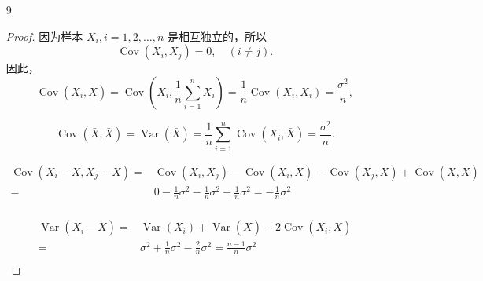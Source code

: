 \documentclass[normal,founder,mtpro2,cn]{elegantnote}
\begin{document}
\begin{enumerate}
        \item[9] 
        \begin{proof}
            因为样本 $X_{i},i=1,2,\ldots,n$ 是相互独立的，所以
            \begin{equation*}
                \operatorname{Cov}\left(X_{i},X_{j}\right)=0,\quad(i\neq j).
            \end{equation*}
            因此，
            \begin{equation*}
                \operatorname{Cov}\left(X_{i},\bar{X}\right)=\operatorname{Cov}\left(X_{i},\frac{1}{n}
                \sum_{i=1}^nX_{i}\right)=\frac{1}{n}\operatorname{Cov}\left(X_{i},X_{i}\right)=\frac{\sigma^2}{n},
            \end{equation*}

            \begin{equation*}
                \operatorname{Cov}(\bar{X}, \bar{X})=\operatorname{Var}\left(\bar{X}\right)=\frac{1}{n}\sum_{i=1}^{n}\operatorname{Cov}\left(X_{i},\bar{X}\right)=\frac{\sigma^2}{n}.
            \end{equation*}

            \begin{equation*}
                \begin{aligned}
                    \operatorname{Cov}\left(X_{i}-\bar{X}, X_{j}-\bar{X}\right)=&\operatorname{Cov}\left(X_{i}, X_{j}\right)-\operatorname{Cov}\left(X_{i}, \bar{X}\right)-\operatorname{Cov}\left(X_{j},\bar{X}\right)+\operatorname{Cov}(\bar{X}, \bar{X}) \\
                    =&0-\frac{1}{n}\sigma^{2}-\frac{1}{n}\sigma^{2}+\frac{1}{n}\sigma^{2}=-\frac{1}{n}\sigma^{2} \\
                \end{aligned}
            \end{equation*}
    
            \begin{equation*}
                \begin{aligned}
                    \operatorname{Var}\left(X_{i}-\bar{X}\right)=&\operatorname{Var}\left(X_{i}\right)+\operatorname{Var}(\bar{X})-2 \operatorname{Cov}\left(X_{i}, \bar{X}\right) \\
                    =&\sigma^{2}+\frac{1}{n} \sigma^{2}-\frac{2}{n} \sigma^{2}=\frac{n-1}{n} \sigma^{2} \\
                \end{aligned}
            \end{equation*}
    

\end{proof}
\end{enumerate}
\end{document}
